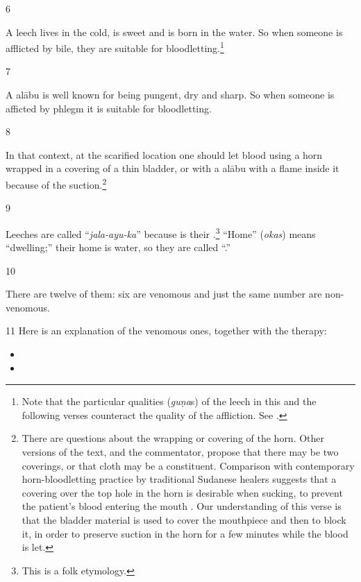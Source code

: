 \begin{translation}
\item[6]

A leech lives in the cold, is sweet and is born in the water. So when
someone is afflicted by bile, they are suitable for
bloodletting.\footnote{Note that the particular qualities (\emph{guṇa}s) of
    the leech in this and the following verses counteract the quality of the
    affliction.  See \cite[113, table 1]{broo-2018}.}

\item[7]

A \gls{alābu} is well known for being pungent, dry and sharp.  So
when someone is afficted by phlegm it is suitable for bloodletting.

\item[8]

In that context, at the scarified location one should let blood using a horn
wrapped in a covering of a thin bladder, or with a \gls{alābu} with a flame
inside it because of the suction.\footnote{There are questions about the
    wrapping or covering of the horn.  Other versions of the text, and the
    commentator, propose that there may be two coverings, or that cloth may be a
    constituent. Comparison with contemporary horn-bloodletting practice by
    traditional Sudanese healers suggests that a covering over the top hole in
    the horn is desirable when sucking, to prevent the patient's blood entering
    the mouth \citep{pbs-2020}.  Our understanding of this verse is that the
    bladder material is used to cover the mouthpiece and then to block it, in
    order to preserve suction in the horn for a few minutes while the blood is
    let. }

\item[9]

Leeches are called “\emph{jala-ayu-ka}” because  is their
.\footnote{This is a folk etymology.} “Home” (\emph{okas})
    means “{dwelling};” their home is water, so they are called
    “.”

\item[10]

There are twelve of them: six are venomous and just the same number are 
non-venomous. 

\item[11]
Here is an explanation of the venomous ones, together with the therapy:
\begin{itemize}
    \item {}
    \item {}
    

\end{itemize}
\end{translation}
